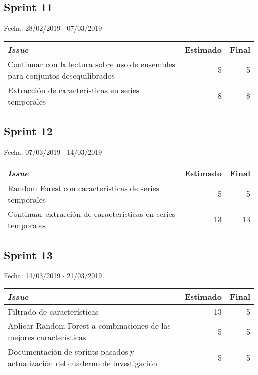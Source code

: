 \subsection{Sprint 11}

Fecha: 28/02/2019 - 07/03/2019



\begin{table}[h]
	\begin{tabularx}{\textwidth}{|Xrr|}
		\hline \textbf{\textit{Issue}} & \textbf{Estimado} & \textbf{Final}\\
		\hline Continuar con la lectura sobre uso de ensembles para conjuntos desequilibrados & 5 & 5 \\
		\hline Extracción de características en series temporales & 8 & 8 \\
		\hline
	\end{tabularx}
\end{table}

\subsection{Sprint 12}

Fecha: 07/03/2019 - 14/03/2019



\begin{table}[h]
	\begin{tabularx}{\textwidth}{|Xrr|}
		\hline \textbf{\textit{Issue}} & \textbf{Estimado} & \textbf{Final}\\
		\hline Random Forest con características de series temporales & 5 & 5 \\
		\hline Continuar extracción de características en series temporales & 13 & 13 \\
		\hline
	\end{tabularx}
\end{table}

\subsection{Sprint 13}

Fecha: 14/03/2019 - 21/03/2019



\begin{table}[h]
	\begin{tabularx}{\textwidth}{|Xrr|}
		\hline \textbf{\textit{Issue}} & \textbf{Estimado} & \textbf{Final}\\
		\hline Filtrado de características & 13 & 5 \\
		\hline Aplicar Random Forest a combinaciones de las mejores características & 5 & 5 \\
		\hline Documentación de sprints pasados y actualización del cuaderno de investigación & 5 & 5 \\
		\hline
	\end{tabularx}
\end{table}

